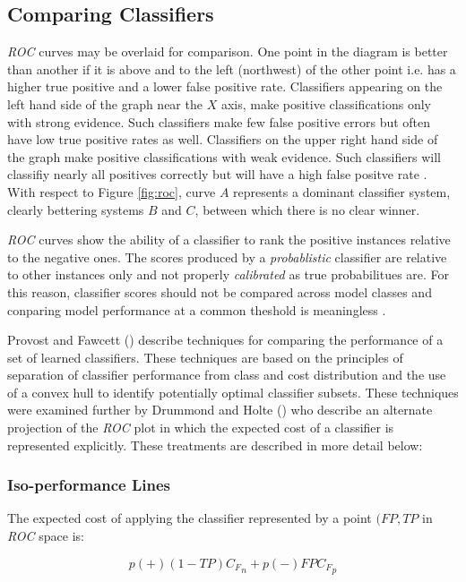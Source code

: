 \documentclass[10pt]{unbthesis}
\begin{document}
\subsection{Comparing Classifiers}
\textit{ROC} curves may be overlaid for comparison. One
point in the diagram is better than another if it is above and to the
left (northwest)
of the other point i.e. has a higher true positive and a lower false positive
rate. Classifiers appearing on the left hand side of the graph near
the \(X\) axis, make positive
classifications only with strong evidence. Such classifiers make few
false positive errors but often have low true positive rates as
well. Classifiers on the upper right hand side of the graph make
positive classifications with weak evidence. Such classifiers will
classifiy nearly all positives correctly but will have a high false
positve rate \cite{Refworks:39}. With respect to Figure \ref{fig:roc},
curve \(A\) represents a dominant classifier system, clearly bettering
systems \(B\) and \(C\), between which there is no clear winner. 

\textit{ROC} curves show the ability of a classifier to rank the
positive instances relative to the negative ones. The scores produced
by a \textit{probablistic} classifier are relative to other instances
only and not properly \textit{calibrated} as true probabilitues
are. For this reason, classifier scores should not be compared across
model classes and conparing model performance at a common theshold is
meaningless \cite{Refworks:39}. 

Provost and Fawcett (\cite{RefWorks:61}) describe techniques for
comparing the performance of a set of learned classifiers. These
techniques are based on the principles of separation of classifier
performance from class and cost distribution and the use of a convex
hull to identify potentially optimal classifier subsets. These
techniques were examined further by Drummond and Holte
(\cite{RefWorks:52}) who describe an alternate projection of the
\textit{ROC} plot in which the expected cost of a classifier is
represented explicitly. These treatments are described in more detail
below: 


\subsubsection{Iso-performance Lines}
The expected cost of applying the classifier represented by a point
\((FP, TP\) in \textit{ROC} space  is:

\begin{equation}
\label{equ:expectedcost}
p(+)(1-TP){C_F}_n + p(-)FP{C_F}_p
\end{equation}
\end{document}
